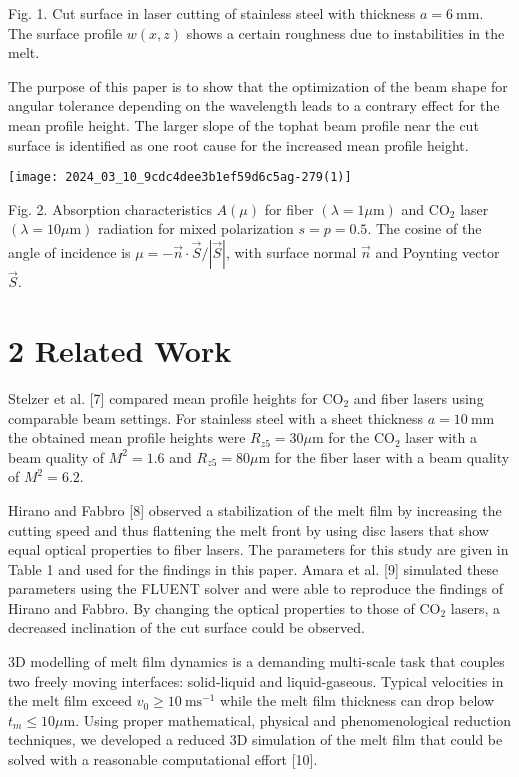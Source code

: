 \documentclass[10pt]{article}
\begin{document}
Fig. 1. Cut surface in laser cutting of stainless steel with thickness $a=6 \mathrm{~mm}$. The surface profile $w(x, z)$ shows a certain roughness due to instabilities in the melt.

The purpose of this paper is to show that the optimization of the beam shape for angular tolerance depending on the wavelength leads to a contrary effect for the mean profile height. The larger slope of the tophat beam profile near the cut surface is identified as one root cause for the increased mean profile height.

\begin{center}
\texttt{[image: 2024\_03\_10\_9cdc4dee3b1ef59d6c5ag-279(1)]}
\end{center}

Fig. 2. Absorption characteristics $A(\mu)$ for fiber $(\lambda=1 \mu \mathrm{m})$ and $\mathrm{CO}_{2}$ laser $(\lambda=10 \mu \mathrm{m})$ radiation for mixed polarization $s=p=0.5$. The cosine of the angle of incidence is $\mu=-\vec{n} \cdot \vec{S} /|\vec{S}|$, with surface normal $\vec{n}$ and Poynting vector $\vec{S}$.

\section*{2 Related Work}
Stelzer et al. [7] compared mean profile heights for $\mathrm{CO}_{2}$ and fiber lasers using comparable beam settings. For stainless steel with a sheet thickness $a=10 \mathrm{~mm}$ the obtained mean profile heights were $R_{z 5}=30 \mu \mathrm{m}$ for the $\mathrm{CO}_{2}$ laser with a beam quality of $M^{2}=1.6$ and $R_{z 5}=80 \mu \mathrm{m}$ for the fiber laser with a beam quality of $M^{2}=6.2$.

Hirano and Fabbro [8] observed a stabilization of the melt film by increasing the cutting speed and thus flattening the melt front by using disc lasers that show equal optical properties to fiber lasers. The parameters for this study are given in Table 1 and used for the findings in this paper. Amara et al. [9] simulated these parameters using the FLUENT solver and were able to reproduce the findings of Hirano and Fabbro. By changing the optical properties to those of $\mathrm{CO}_{2}$ lasers, a decreased inclination of the cut surface could be observed.

3D modelling of melt film dynamics is a demanding multi-scale task that couples two freely moving interfaces: solid-liquid and liquid-gaseous. Typical velocities in the melt film exceed $v_{0} \geq 10 \mathrm{~ms}^{-1}$ while the melt film thickness can drop below $t_{m} \leq 10 \mu \mathrm{m}$. Using proper mathematical, physical and phenomenological reduction techniques, we developed a reduced 3D simulation of the melt film that could be solved with a reasonable computational effort [10].
\end{document}
